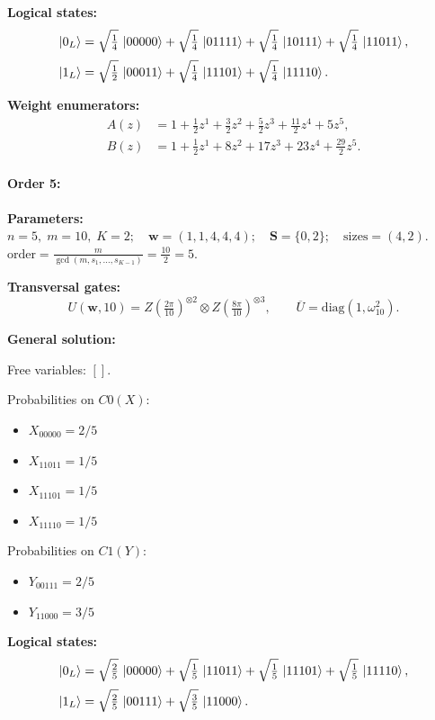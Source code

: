 \documentclass[11pt]{article}
\begin{document}
\noindent\textbf{Logical states:}
\begin{align*}
\ket{0_L} &= \sqrt{\tfrac{1}{4}}\,\ket{00000} + \sqrt{\tfrac{1}{4}}\,\ket{01111} + \sqrt{\tfrac{1}{4}}\,\ket{10111} + \sqrt{\tfrac{1}{4}}\,\ket{11011},
\\[2pt]
\ket{1_L} &= \sqrt{\tfrac{1}{2}}\,\ket{00011} + \sqrt{\tfrac{1}{4}}\,\ket{11101} + \sqrt{\tfrac{1}{4}}\,\ket{11110}.
\end{align*}

\noindent\textbf{Weight enumerators:}
\begin{align*}
A(z) &= 1 + \tfrac{1}{2}z^{1} + \tfrac{3}{2}z^{2} + \tfrac{5}{2}z^{3} + \tfrac{11}{2}z^{4} + 5z^{5},\\[2pt]
B(z) &= 1 + \tfrac{1}{2}z^{1} + 8z^{2} + 17z^{3} + 23z^{4} + \tfrac{29}{2}z^{5}.
\end{align*}

\paragraph{\textbf{Order 5:}}
\noindent\textbf{Parameters:} $n=5,\; m=10,\; K=2;\quad \mathbf w=(1, 1, 4, 4, 4);\quad \mathbf S=\{0, 2\};\quad \text{sizes}=\left(4, 2\right).$ $\displaystyle \text{order}=\frac{m}{\gcd(m,s_1,\dots,s_{K-1})}=\frac{10}{2}=5.$

\noindent\textbf{Transversal gates:}
\[
    U(\mathbf w,10)=Z \left(\tfrac{2\pi}{10}\right)^{\otimes2} \otimes Z \left(\tfrac{8\pi}{10}\right)^{\otimes3},\qquad
    \overline U=\mathrm{diag}(1,\omega_{10}^{2}).
\]

\noindent\textbf{General solution:}

Free variables: $[]$.

Probabilities on $C0 (X)$:
\begin{itemize}
    \item $X_{00000} = 2/5$
    \item $X_{11011} = 1/5$
    \item $X_{11101} = 1/5$
    \item $X_{11110} = 1/5$
\end{itemize}

Probabilities on $C1 (Y)$:
\begin{itemize}
    \item $Y_{00111} = 2/5$
    \item $Y_{11000} = 3/5$
\end{itemize}

\noindent\textbf{Logical states:}
\begin{align*}
\ket{0_L} &= \sqrt{\tfrac{2}{5}}\,\ket{00000} + \sqrt{\tfrac{1}{5}}\,\ket{11011} + \sqrt{\tfrac{1}{5}}\,\ket{11101} + \sqrt{\tfrac{1}{5}}\,\ket{11110},
\\[2pt]
\ket{1_L} &= \sqrt{\tfrac{2}{5}}\,\ket{00111} + \sqrt{\tfrac{3}{5}}\,\ket{11000}.
\end{align*}
\end{document}
